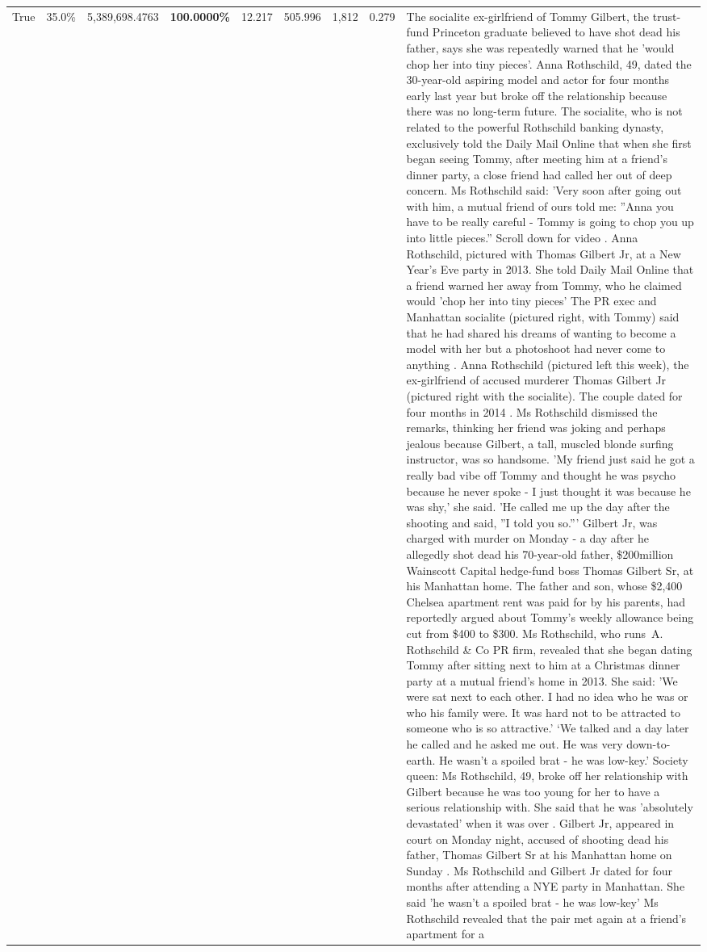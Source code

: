 \begin{table}[H]
\begin{tabular}{lllrlllll}
True & 35.0\% & 5,389,698.4763 & \bfseries \color{red} 100.0000\% & 12.217 & 505.996 & 1,812 & 0.279 & The socialite ex-girlfriend of Tommy Gilbert, the trust-fund Princeton graduate believed to have shot dead his father, says she was repeatedly warned that he 'would chop her into tiny pieces'. Anna Rothschild, 49, dated the 30-year-old aspiring model and actor for four months early last year but broke off the relationship because there was no long-term future. The socialite, who is not related to the powerful Rothschild banking dynasty, exclusively told the Daily Mail Online that when she first began seeing Tommy, after meeting him at a friend's dinner party, a close friend had called her out of deep concern. Ms Rothschild said: 'Very soon after going out with him, a mutual friend of ours told me: ''Anna you have to be really careful - Tommy is going to chop you up into little pieces.'' Scroll down for video . Anna Rothschild, pictured with Thomas Gilbert Jr, at a New Year's Eve party in 2013. She told Daily Mail Online that a friend warned her away from Tommy, who he claimed would 'chop her into tiny pieces' The PR exec and Manhattan socialite (pictured right, with Tommy) said that he had shared his dreams of wanting to become a model with her but a photoshoot had never come to anything . Anna Rothschild (pictured left this week), the ex-girlfriend of accused murderer Thomas Gilbert Jr (pictured right with the socialite). The couple dated for four months in 2014 . Ms Rothschild dismissed the remarks, thinking her friend was joking and perhaps jealous because Gilbert, a tall, muscled blonde surfing instructor, was so handsome. 'My friend just said he got a really bad vibe off Tommy and thought he was psycho because he never spoke - I just thought it was because he was shy,' she said. 'He called me up the day after the shooting and said, ''I told you so.''' Gilbert Jr, was charged with murder on Monday - a day after he allegedly shot dead his 70-year-old father, \$200million Wainscott Capital hedge-fund boss Thomas Gilbert Sr, at his Manhattan home. The father and son, whose \$2,400 Chelsea apartment rent was paid for by his parents, had reportedly argued about Tommy's weekly allowance being cut from \$400 to \$300. Ms Rothschild, who runs A. Rothschild \& Co PR firm, revealed that she began dating Tommy after sitting next to him at a Christmas dinner party at a mutual friend's home in 2013. She said: 'We were sat next to each other. I had no idea who he was or who his family were. It was hard not to be attracted to someone who is so attractive.' ‘We talked and a day later he called and he asked me out. He was very down-to-earth. He wasn’t a spoiled brat - he was low-key.’ Society queen: Ms Rothschild, 49, broke off her relationship with Gilbert because he was too young for her to have a serious relationship with. She said that he was 'absolutely devastated' when it was over . Gilbert Jr, appeared in court on Monday night, accused of shooting dead his father, Thomas Gilbert Sr at his Manhattan home on Sunday . Ms Rothschild and Gilbert Jr dated for four months after attending a NYE party in Manhattan. She said 'he wasn't a spoiled brat - he was low-key' Ms Rothschild revealed that the pair met again at a friend’s apartment for a 
\end{tabular}
\end{table}
